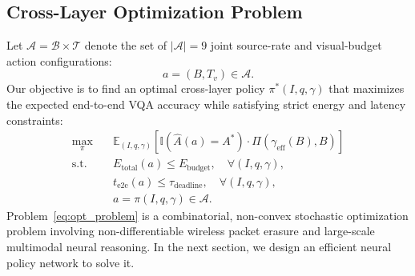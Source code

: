 \subsection{Cross-Layer Optimization Problem}
Let $\mathcal{A} = \mathcal{B} \times \mathcal{T}$ denote the set of $|\mathcal{A}| = 9$ joint source-rate and visual-budget action configurations:
\begin{equation}
a = (B, T_v) \in \mathcal{A}.
\end{equation}
Our objective is to find an optimal cross-layer policy $\pi^*(I, q, \gamma)$ that maximizes the expected end-to-end VQA accuracy while satisfying strict energy and latency constraints:
\begin{subequations}\label{eq:opt_problem}
\begin{align}
\max_{\pi} \quad & \mathbb{E}_{(I, q, \gamma)}\left[ \mathbb{I}(\hat{A}(a) = A^*) \cdot \Pi(\gamma_{\mathrm{eff}}(B), B) \right] \label{eq:opt_obj} \\
\text{s.t.} \quad & E_{\mathrm{total}}(a) \le E_{\mathrm{budget}}, \quad \forall (I, q, \gamma), \label{eq:cons_energy} \\
& t_{\mathrm{e2e}}(a) \le \tau_{\mathrm{deadline}}, \quad \forall (I, q, \gamma), \label{eq:cons_latency} \\
& a = \pi(I, q, \gamma) \in \mathcal{A}. \label{eq:cons_action}
\end{align}
\end{subequations}
Problem~\eqref{eq:opt_problem} is a combinatorial, non-convex stochastic optimization problem involving non-differentiable wireless packet erasure and large-scale multimodal neural reasoning. In the next section, we design an efficient neural policy network to solve it.
